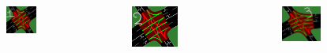 \documentclass[dvipsnames]{beamer}
\begin{document}
\begin{frame}
  \begin{columns}
    \begin{column}{0.3\textwidth}
      \begin{figure}
        \centering
        \includegraphics[width=0.65\textwidth]{figures/sumo-rf-tls-1.png}
      \end{figure}
    \end{column}
    \begin{column}{0.3\textwidth}
      \begin{figure}
        \centering
        \includegraphics[width=0.65\textwidth]{figures/sumo-rf-tls-2.png}
      \end{figure}
    \end{column}
    \begin{column}{0.3\textwidth}
      \begin{figure}
        \centering
        \includegraphics[width=0.65\textwidth]{figures/sumo-rf-tls-3.png}

\end{figure}
\end{column}
\end{columns}
\end{frame}
\end{document}
